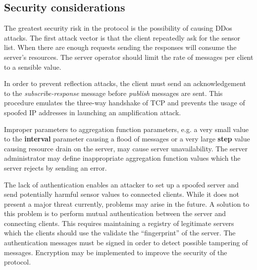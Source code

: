 \documentclass[a4paper]{article}
\begin{document}
\subsection{Security considerations}
The greatest security risk in the protocol is the possibility of causing DDos
attacks. The first attack vector is that the client repeatedly ask for the 
sensor list. When there are enough requests sending the responses will consume
the server's resources. The server operator should limit the rate of messages per
client to a sensible value. 

In order to prevent reflection attacks, the client must send an acknowledgement
to the \emph{subscribe-response} message before \emph{publish} messages are sent.
This procedure emulates the three-way handshake of TCP and prevents the usage
of spoofed IP addresses in launching an amplification attack.

Improper parameters to aggregation function parameters, e.g. a very small value
to the \textbf{interval} parameter causing a flood of messages or a very large
\textbf{step} value causing resource drain on the server, may cause server
unavailability. The server administrator may define inappropriate aggregation 
function values which the server rejects by sending an error.

The lack of authentication enables an attacker to set up a spoofed server and
send potentially harmful sensor values to connected clients. While it does not
present a major threat currently, problems may arise in the future. A solution
to this problem is to perform mutual authentication between the server and 
connecting clients. This requires maintaining a registry of legitimate
servers which the clients should use the validate the ``fingerprint'' of the
server. The authentication messages must be signed in order to detect possible 
tampering of messages. Encryption may be implemented to improve the security of 
the protocol.

\end{document}

